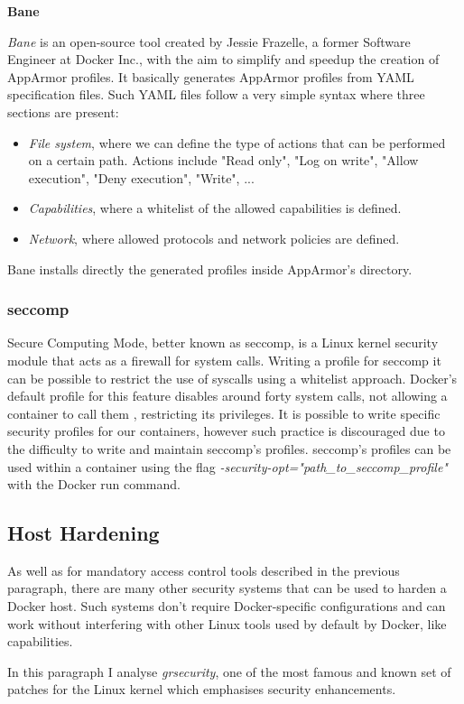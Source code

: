 \documentclass[a4paper,12pt]{article}
\begin{document}
\bigbreak\textbf{Bane}\bigbreak 

\textit{Bane} \cite{bane_jesse_frazelle} is an open-source tool created by
Jessie Frazelle, a former Software Engineer at Docker Inc., with the aim to
simplify and speedup the creation of AppArmor profiles. It basically generates
AppArmor profiles from YAML specification files. Such YAML files follow a very
simple syntax where three sections are present:
\begin{itemize}
  \item \textit{File system}, where we can define the type of actions that can be
  performed on a certain path. Actions include "Read only", "Log on write",
  "Allow execution", "Deny execution", "Write", ...
  \item \textit{Capabilities}, where a whitelist of the allowed capabilities is
  defined. 
  \item \textit{Network}, where allowed protocols and network policies are
  defined.
\end{itemize}
Bane installs directly the generated profiles inside AppArmor's directory.  

\subsubsection{seccomp}

Secure Computing Mode, better known as seccomp, is a Linux kernel security
module that acts as a firewall for system calls. Writing a profile for seccomp
it can be possible to restrict the use of syscalls using a whitelist approach.
Docker's default profile for this feature disables around forty system calls,
not allowing a container to call them , restricting its privileges. It is
possible to write specific security profiles for our containers, however such
practice is discouraged due to the difficulty to write and maintain seccomp's
profiles. seccomp's profiles can be used within a container using the flag
\textit{-security-opt="path\_to\_seccomp\_profile"} with the Docker run command.

\subsection{Host Hardening}

As well as for mandatory access control tools described in the previous
paragraph, there are many other security systems that can be used to harden a
Docker host. Such systems don't require Docker-specific configurations and can
work without interfering with other Linux tools used by default by Docker, like
capabilities. \par In this paragraph I analyse \textit{grsecurity}, one of the
most famous and known set of  patches for the Linux kernel which emphasises
security enhancements.
\end{document}
